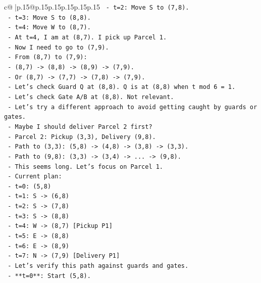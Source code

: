 \documentclass{article}
\begin{document}
{\begin{supertabular}{c@{$\;$}|p{.15\linewidth}@{}p{.15\linewidth}p{.15\linewidth}p{.15\linewidth}p{.15\linewidth}p{.15\linewidth}}
{{{\texttt{        {-}   t=2: Move S to (7,8).} \\
\texttt{        {-}   t=3: Move S to (8,8).} \\
\texttt{        {-}   t=4: Move W to (8,7).} \\
\texttt{    {-}   At t=4, I am at (8,7). I pick up Parcel 1.} \\
\texttt{    {-}   Now I need to go to (7,9).} \\
\texttt{    {-}   From (8,7) to (7,9):} \\
\texttt{        {-}   (8,7) {-}> (8,8) {-}> (8,9) {-}> (7,9).} \\
\texttt{        {-}   Or (8,7) {-}> (7,7) {-}> (7,8) {-}> (7,9).} \\
\texttt{    {-}   Let's check Guard Q at (8,8). Q is at (8,8) when t mod 6 = 1.} \\
\texttt{    {-}   Let's check Gate A/B at (8,8). Not relevant.} \\
\texttt{    {-}   Let's try a different approach to avoid getting caught by guards or gates.} \\
\texttt{    {-}   Maybe I should deliver Parcel 2 first?} \\
\texttt{    {-}   Parcel 2: Pickup (3,3), Delivery (9,8).} \\
\texttt{    {-}   Path to (3,3): (5,8) {-}> (4,8) {-}> (3,8) {-}> (3,3).} \\
\texttt{    {-}   Path to (9,8): (3,3) {-}> (3,4) {-}> ... {-}> (9,8).} \\
\texttt{    {-}   This seems long. Let's focus on Parcel 1.} \\
\texttt{    {-}   Current plan:} \\
\texttt{        {-}   t=0: (5,8)} \\
\texttt{        {-}   t=1: S {-}> (6,8)} \\
\texttt{        {-}   t=2: S {-}> (7,8)} \\
\texttt{        {-}   t=3: S {-}> (8,8)} \\
\texttt{        {-}   t=4: W {-}> (8,7) {[}Pickup P1{]}} \\
\texttt{        {-}   t=5: E {-}> (8,8)} \\
\texttt{        {-}   t=6: E {-}> (8,9)} \\
\texttt{        {-}   t=7: N {-}> (7,9) {[}Delivery P1{]}} \\
\texttt{    {-}   Let's verify this path against guards and gates.} \\
\texttt{    {-}   **t=0**: Start (5,8).} \\
}}}
\end{supertabular}}
\end{document}
